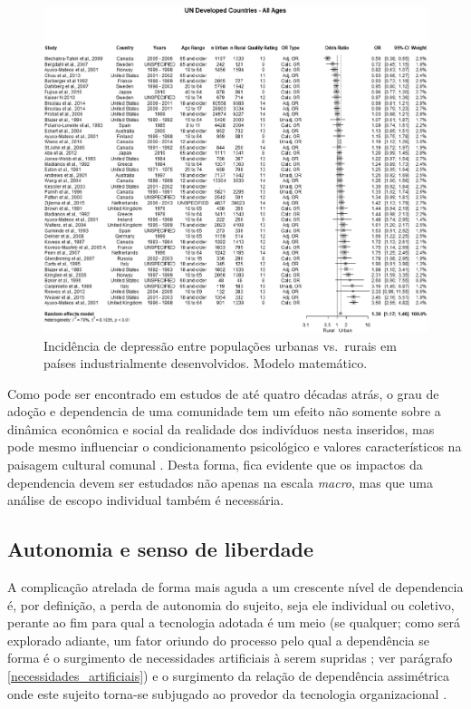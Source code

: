 \begin{figure}[h]
    \centering
    \includegraphics[width=15cm]{Content/Images/depression_rate.jpg}
    \caption{Incidência de depressão entre populações urbanas vs.\ rurais em países industrialmente desenvolvidos. Modelo
  matemático. \cite{XU2023299}}
\end{figure}

Como pode ser encontrado em estudos de até quatro décadas atrás, o grau de adoção e \gls{dependencia} de uma comunidade tem
um efeito não somente sobre a dinâmica econômica e social da realidade dos indivíduos nesta inseridos, mas pode mesmo
influenciar o condicionamento psicológico e valores característicos na paisagem cultural comunal \cite[27-30]{secretariat1977}.
Desta forma, fica evidente que os impactos da \gls{dependencia} devem ser estudados não apenas na escala \textit{macro},
mas que uma análise de escopo individual também é necessária.

\subsection{Autonomia e senso de liberdade}\label{autonomia}

A complicação atrelada de forma mais aguda a um crescente nível de \gls{dependencia} é, por definição, a perda de autonomia do
sujeito, seja ele individual ou coletivo, perante ao fim para qual a tecnologia adotada é um meio (se qualquer; como
será explorado adiante, um fator oriundo do processo pelo qual a dependência se forma é o surgimento de necessidades
artificiais à serem supridas \cite[\S59-65]{kaczynski1995}; ver parágrafo \ref{necessidades_artificiais}) e o surgimento
da relação de dependência assimétrica onde este sujeito torna-se subjugado ao provedor da tecnologia organizacional
\cite[27-30]{secretariat1977}.

